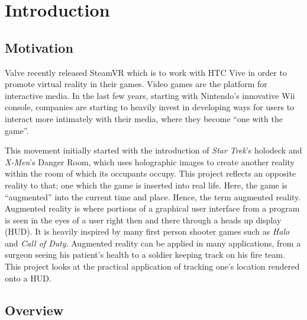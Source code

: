 
\chapter{Introduction} %

\label{Introduction} %


\section{Motivation}

Valve recently released SteamVR which is to work with HTC Vive in order to promote virtual reality in their games. Video games are the platform for interactive media. In the last few years, starting with Nintendo’s innovative Wii console, companies are starting to heavily invest in developing ways for users to interact more intimately with their media, where they become ``one with the game”. 

This movement initially started with the introduction of \emph{Star Trek}’s holodeck and \emph{X-Men}’s Danger Room, which uses holographic images to create another reality within the room of which its occupants occupy. This project reflects an opposite reality to that; one which the game is inserted into real life. Here, the game is “augmented” into the current time and place. Hence, the term augmented reality. Augmented reality is where portions of a graphical user interface from a program is seen in the eyes of a user right then and there through a heads up display (HUD). It is heavily inspired by many first person shooter games such as \emph{Halo} and \emph{Call of Duty}. Augmented reality can be applied in many applications, from a surgeon seeing his patient’s health to a soldier keeping track on his fire team. This project looks at the practical application of tracking one’s location rendered onto a HUD.

\section{Overview}

